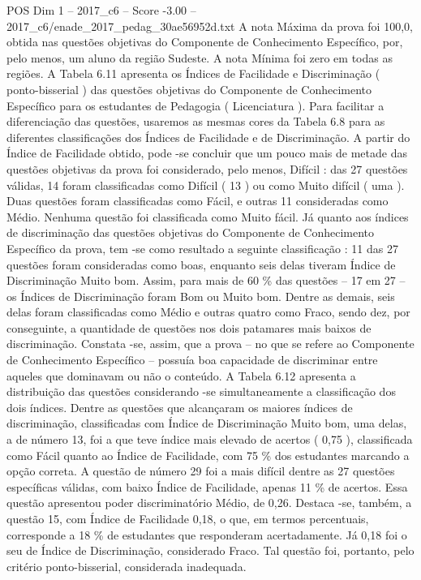 \begin{textsample}{POS Dim 1 – 2017\_c6 – Score -3.00 – 2017\_c6/enade\_2017\_pedag\_30ae56952d.txt}
A nota Máxima da prova foi 100,0, obtida nas questões objetivas do Componente de Conhecimento Específico, por, pelo menos, um aluno da região Sudeste.
A nota Mínima foi zero em todas as regiões.
A Tabela 6.11 apresenta os Índices de Facilidade e Discriminação ( ponto-bisserial ) das questões objetivas do Componente de Conhecimento Específico para os estudantes de Pedagogia ( Licenciatura ).
Para facilitar a diferenciação das questões, usaremos as mesmas cores da Tabela 6.8 para as diferentes classificações dos Índices de Facilidade e de Discriminação.
A partir do Índice de Facilidade obtido, pode -se concluir que um pouco mais de metade das questões objetivas da prova foi considerado, pelo menos, Difícil : das 27 questões válidas, 14 foram classificadas como Difícil ( 13 ) ou como Muito difícil ( uma ).
Duas questões foram classificadas como Fácil, e outras 11 consideradas como Médio.
Nenhuma questão foi classificada como Muito fácil.
Já quanto aos índices de discriminação das questões objetivas do Componente de Conhecimento Específico da prova, tem -se como resultado a seguinte classificação : 11 das 27 questões foram consideradas como boas, enquanto seis delas tiveram Índice de Discriminação Muito bom.
Assim, para mais de 60 \% das questões – 17 em 27 – os Índices de Discriminação foram Bom ou Muito bom.
Dentre as demais, seis delas foram classificadas como Médio e outras quatro como Fraco, sendo dez, por conseguinte, a quantidade de questões nos dois patamares mais baixos de discriminação.
Constata -se, assim, que a prova – no que se refere ao Componente de Conhecimento Específico – possuía boa capacidade de discriminar entre aqueles que dominavam ou não o conteúdo.
A Tabela 6.12 apresenta a distribuição das questões considerando -se simultaneamente a classificação dos dois índices.
Dentre as questões que alcançaram os maiores índices de discriminação, classificadas com Índice de Discriminação Muito bom, uma delas, a de número 13, foi a que teve índice mais elevado de acertos ( 0,75 ), classificada como Fácil quanto ao Índice de Facilidade, com 75 \% dos estudantes marcando a opção correta.
A questão de número 29 foi a mais difícil dentre as 27 questões específicas válidas, com baixo Índice de Facilidade, apenas 11 \% de acertos.
Essa questão apresentou poder discriminatório Médio, de 0,26.
Destaca -se, também, a questão 15, com Índice de Facilidade 0,18, o que, em termos percentuais, corresponde a 18 \% de estudantes que responderam acertadamente.
Já 0,18 foi o seu de Índice de Discriminação, considerado Fraco.
Tal questão foi, portanto, pelo critério ponto-bisserial, considerada inadequada.

\end{textsample}

